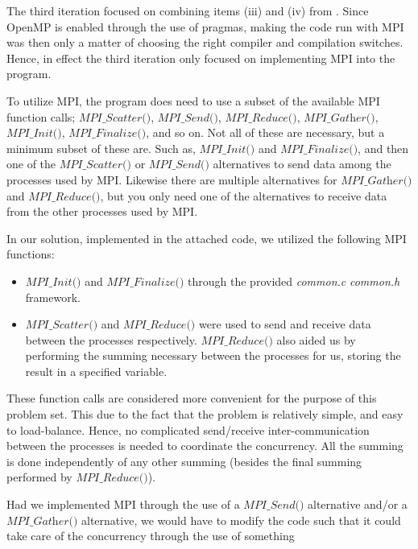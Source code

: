 \documentclass[fontsize=11pt,paper=a4,titlepage]{report}
\begin{document}

The third iteration focused on combining items (iii) and (iv) from \cite{RunMode}.
Since OpenMP is enabled through the use of pragmas, making the code run with MPI
was then only a matter of choosing the right compiler and compilation switches.
Hence, in effect the third iteration only focused on implementing MPI into the
program.

To utilize MPI, the program does need to use a subset of the available MPI
function calls; $\textit{MPI\_Scatter()}$, $\textit{MPI\_Send()}$,
$\textit{MPI\_Reduce()}$, $\textit{MPI\_Gather()}$, $\textit{MPI\_Init()}$,
$\textit{MPI\_Finalize()}$, and so on. Not all of these are necessary, but a
minimum subset of these are. Such as, $\textit{MPI\_Init()}$ and $\textit{
MPI\_Finalize()}$, and then one of the $\textit{MPI\_Scatter()}$ or
$\textit{MPI\_Send()}$ alternatives to send data among the processes used by
MPI. Likewise there are multiple alternatives for $\textit{MPI\_Gather()}$ and
$\textit{MPI\_Reduce()}$, but you only need one of the alternatives to receive
data from the other processes used by MPI.

In our solution, implemented in the attached code, we utilized the following MPI
functions:

\begin{itemize}
	\item{$\textit{MPI\_Init()}$ and $\textit{
MPI\_Finalize()}$ through the provided \textit{common.c} \textit{common.h}
framework.}
	\item{$\textit{MPI\_Scatter()}$ and $\textit{MPI\_Reduce()}$ were used to
send and receive data between the processes respectively.
$\textit{MPI\_Reduce()}$ also aided us by performing the summing necessary
between the processes for us, storing the result in a specified variable.}
\end{itemize}

These function calls are considered more convenient for the purpose of this
problem set. This due to the fact that the problem is relatively simple, and
easy to load-balance. Hence, no complicated send/receive inter-communication
between the processes is needed to coordinate the concurrency. All the summing
is done independently of any other summing (besides the final summing performed
by $\textit{MPI\_Reduce()}$).

Had we implemented MPI through the use of a $\textit{MPI\_Send()}$ alternative
and/or a $\textit{MPI\_Gather()}$ alternative, we would have to modify the code
such that it could take care of the concurrency through the use of something
\end{document}
